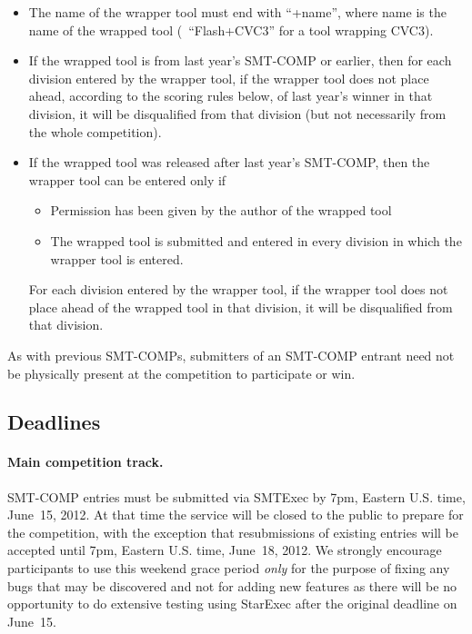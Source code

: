 \documentclass[12pt]{article}
\begin{document}
\begin{itemize}
\item The name of the wrapper tool must end with ``+name'', where name
is the name of the wrapped tool (\eg\ ``Flash+CVC3'' for a tool
wrapping CVC3).

\item If the wrapped tool is from last year's SMT-COMP or earlier, then for
each division entered by the wrapper tool, if the wrapper tool does not place ahead, according to the scoring
rules below, of last year's winner in that division, it will be disqualified
from that division (but not necessarily from the whole competition).

\item If the wrapped tool was released after last year's SMT-COMP,
then the wrapper tool can be entered only if

\begin{itemize}
\item Permission has been given by the author of the wrapped tool

\item The wrapped tool is submitted and entered in every division
      in which the wrapper tool is entered.
\end{itemize}

For each division entered by the wrapper tool, if the wrapper tool
does not place ahead of the wrapped tool in that division, it will be
disqualified from that division.
\end{itemize}

As with previous SMT-COMPs, submitters of an SMT-COMP entrant need not 
be physically present at the competition to
participate or win.

\subsection*{Deadlines} %

\paragraph{Main competition track.} %
SMT-COMP entries must be submitted via SMTExec by 7pm, Eastern U.S.
time, June~15, 2012.  At that time the service will be
closed to the public to prepare for the competition, with the
exception that resubmissions of existing entries will be accepted
until 7pm, Eastern U.S. time, June~18, 2012.  We strongly encourage
participants to use this weekend grace period \emph{only} for the
purpose of fixing any bugs that may be discovered and not for adding
new features as there will be no opportunity to do extensive testing
using StarExec after the original deadline on June~15.
\end{document}
